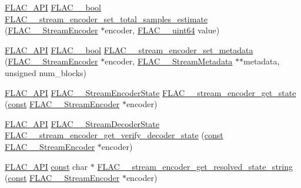 \begin{DoxyCompactItemize}
\item 
\hyperlink{group__flac__export_ga56ca07df8a23310707732b1c0007d6f5}{F\+L\+A\+C\+\_\+\+A\+PI} \hyperlink{ordinals_8h_a95103469f1cbd78b8cf250194985b34e}{F\+L\+A\+C\+\_\+\+\_\+bool} \hyperlink{group__flac__stream__encoder_ga0d3f45052f2f7379c73e2b027c7f956c}{F\+L\+A\+C\+\_\+\+\_\+stream\+\_\+encoder\+\_\+set\+\_\+total\+\_\+samples\+\_\+estimate} (\hyperlink{struct_f_l_a_c_____stream_encoder}{F\+L\+A\+C\+\_\+\+\_\+\+Stream\+Encoder} $\ast$encoder, \hyperlink{ordinals_8h_aa78c8c70a3eb8a58af7436f278acde8e}{F\+L\+A\+C\+\_\+\+\_\+uint64} value)
\item 
\hyperlink{group__flac__export_ga56ca07df8a23310707732b1c0007d6f5}{F\+L\+A\+C\+\_\+\+A\+PI} \hyperlink{ordinals_8h_a95103469f1cbd78b8cf250194985b34e}{F\+L\+A\+C\+\_\+\+\_\+bool} \hyperlink{group__flac__stream__encoder_ga67b30b1a67a9274f7708a22154b225f6}{F\+L\+A\+C\+\_\+\+\_\+stream\+\_\+encoder\+\_\+set\+\_\+metadata} (\hyperlink{struct_f_l_a_c_____stream_encoder}{F\+L\+A\+C\+\_\+\+\_\+\+Stream\+Encoder} $\ast$encoder, \hyperlink{struct_f_l_a_c_____stream_metadata}{F\+L\+A\+C\+\_\+\+\_\+\+Stream\+Metadata} $\ast$$\ast$metadata, unsigned num\+\_\+blocks)
\item 
\hyperlink{group__flac__export_ga56ca07df8a23310707732b1c0007d6f5}{F\+L\+A\+C\+\_\+\+A\+PI} \hyperlink{group__flac__stream__encoder_gac5e9db4fc32ca2fa74abd9c8a87c02a5}{F\+L\+A\+C\+\_\+\+\_\+\+Stream\+Encoder\+State} \hyperlink{group__flac__stream__encoder_gaff7284e55f01b59ed8f03317df510992}{F\+L\+A\+C\+\_\+\+\_\+stream\+\_\+encoder\+\_\+get\+\_\+state} (\hyperlink{zconf_8h_a2c212835823e3c54a8ab6d95c652660e}{const} \hyperlink{struct_f_l_a_c_____stream_encoder}{F\+L\+A\+C\+\_\+\+\_\+\+Stream\+Encoder} $\ast$encoder)
\item 
\hyperlink{group__flac__export_ga56ca07df8a23310707732b1c0007d6f5}{F\+L\+A\+C\+\_\+\+A\+PI} \hyperlink{group__flac__stream__decoder_ga3adb6891c5871a87cd5bbae6c770ba2d}{F\+L\+A\+C\+\_\+\+\_\+\+Stream\+Decoder\+State} \hyperlink{group__flac__stream__encoder_gac613bebe4181568e7ca59cca30294e52}{F\+L\+A\+C\+\_\+\+\_\+stream\+\_\+encoder\+\_\+get\+\_\+verify\+\_\+decoder\+\_\+state} (\hyperlink{zconf_8h_a2c212835823e3c54a8ab6d95c652660e}{const} \hyperlink{struct_f_l_a_c_____stream_encoder}{F\+L\+A\+C\+\_\+\+\_\+\+Stream\+Encoder} $\ast$encoder)
\item 
\hyperlink{group__flac__export_ga56ca07df8a23310707732b1c0007d6f5}{F\+L\+A\+C\+\_\+\+A\+PI} \hyperlink{zconf_8h_a2c212835823e3c54a8ab6d95c652660e}{const} char $\ast$ \hyperlink{group__flac__stream__encoder_gac909fca7b0e2aacaf772f3aa0e42c0db}{F\+L\+A\+C\+\_\+\+\_\+stream\+\_\+encoder\+\_\+get\+\_\+resolved\+\_\+state\+\_\+string} (\hyperlink{zconf_8h_a2c212835823e3c54a8ab6d95c652660e}{const} \hyperlink{struct_f_l_a_c_____stream_encoder}{F\+L\+A\+C\+\_\+\+\_\+\+Stream\+Encoder} $\ast$encoder)
$$
\end{DoxyCompactItemize}

